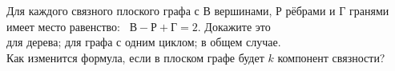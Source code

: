 \documentclass[12pt,a4paper]{article}
\begin{document}



Для каждого связного плоского графа с $В$ вершинами,
$Р$ р\"ебрами и $Г$ гранями имеет место равенство: \ $В-Р+Г=2$.
Докажите это\\
для дерева;
 для графа с одним циклом;
в общем случае.\\
 Как изменится формула, если в плоском графе будет $k$ компонент связности?
\end{document}
